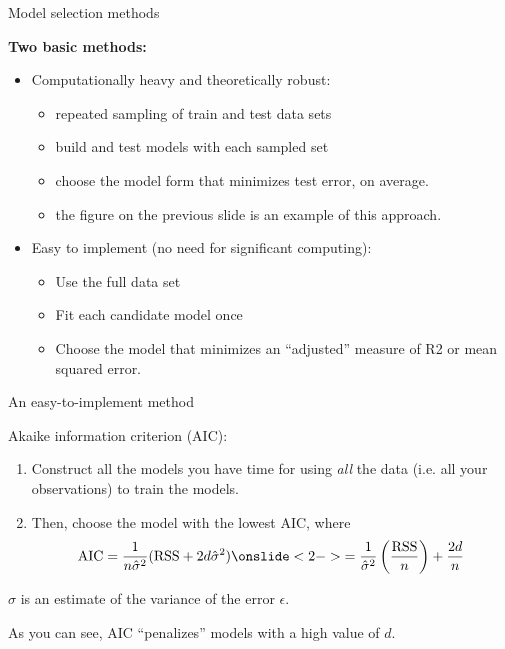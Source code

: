 \documentclass[aspectratio=169, handout]{beamer}
\begin{document}
\begin{frame}{Model selection methods}

\textbf{Two basic methods:}
\vspace{5mm}
\begin{itemize}
\item Computationally heavy and theoretically robust: 
\begin{itemize}
\item repeated sampling of train and test data sets
\item build and test models with each sampled set
\item choose the model form that minimizes test error, on average.
\item the figure on the previous slide is an example of this approach.
\end{itemize}
\vspace{5mm}
\item Easy to implement (no need for significant computing):
\begin{itemize}
\item Use the full data set
\item Fit each candidate model once
\item Choose the model that minimizes an ``adjusted'' measure of R2 or mean squared error.
\end{itemize}
\end{itemize}
\end{frame}

\begin{frame}{An easy-to-implement method}

Akaike information criterion (AIC):

\begin{enumerate}
\item Construct all the models you have time for using \textit{all} the data (i.e. all your observations) to train the models.
\item Then, choose the model with the lowest AIC, where
\begin{align*}
\text{AIC} = \frac{1}{n\hat{\sigma}^2}(\text{RSS}+2d\hat{\sigma}^2) \onslide<2->{= \frac{1}{\hat{\sigma}^2}\left(\frac{\text{RSS}}{n}\right) + \frac{2d}{n}}
\end{align*}
\end{enumerate}

$\hat{\sigma}$ is an estimate of the variance of the error $\epsilon$.

\pause
\vspace*{5mm}
As you can see, AIC ``penalizes'' models with a high value of $d$.  
\end{frame}
\end{document}
